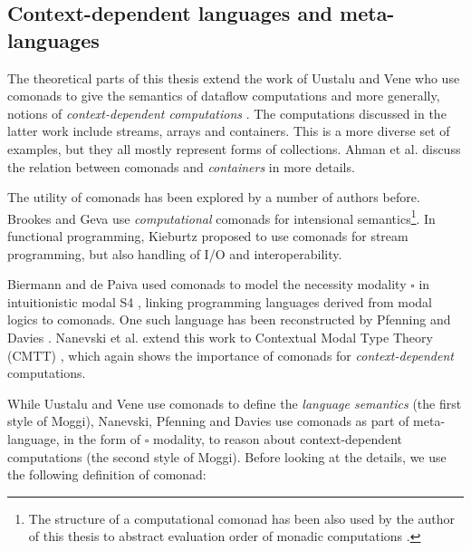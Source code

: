 
\subsection{Context-dependent languages and meta-languages}
\label{sec:path-sem-contextdep}

The theoretical parts of this thesis extend the work of Uustalu and Vene who use comonads
to give the semantics of dataflow computations \cite{comonads-dataflow} and more generally,
notions of \emph{context-dependent computations} \cite{comonads-notions}. The computations discussed
in the latter work include streams, arrays and containers. This is a more diverse set of examples,
but they all mostly represent forms of collections. Ahman et al. \cite{comonads-containers} discuss
the relation between comonads and \emph{containers} \cite{types-containers} in more details.

The utility of comonads has been explored by a number of authors before. Brookes and Geva
\cite{comonads-computational} use \emph{computational} comonads for intensional semantics\footnote{The
structure of a computational comonad has been also used by the author of this thesis to abstract
evaluation order of monadic computations \cite{comonads-malias}.}. In functional programming,
Kieburtz \cite{comonads-and-codata} proposed to use comonads for stream programming, but also
handling of I/O and interoperability.

Biermann and de Paiva used comonads to model the necessity modality $\square$ in intuitionistic
modal S4 \cite{logic-intuitionistic-modal}, linking programming languages derived from modal
logics to comonads. One such language has been reconstructed by Pfenning and Davies
\cite{logic-modal-reconstruction}. Nanevski et al. extend this work to Contextual Modal Type
Theory (CMTT) \cite{logic-cmtt}, which again shows the importance of comonads for
\emph{context-dependent} computations.

While Uustalu and Vene use comonads to define the \emph{language semantics} (the first style
of Moggi), Nanevski, Pfenning and Davies use comonads as part of meta-language, in the form
of $\square$ modality, to reason about context-dependent computations (the second style of
Moggi). Before looking at the details, we use the following definition of comonad:

